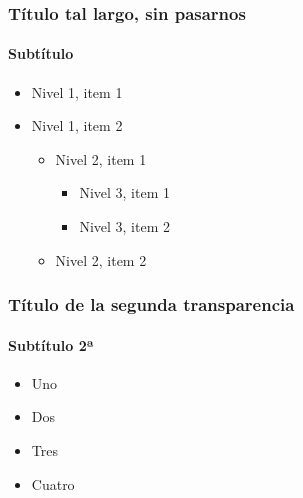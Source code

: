\documentclass[spanish,a4]{beamer}
\title[Defensa \myWorkType \textemdash \myAuthorFullName]{\myBookTitle}
\author{\myAuthorFullName}
\institute{\myResearchGroup \\ \DocumentDepartment \\ \myUniversity}
\begin{document}
\begin{frame}[plain]
  \titlepage
\end{frame}


\begin{frame}
  
  \frametitle{Título tal largo, sin pasarnos}  
  \framesubtitle{Subtítulo}  
  
  \begin{itemize}
  \item Nivel 1, item 1
  \item Nivel 1, item 2
    \begin{itemize}
    \item Nivel 2, item 1
      \begin{itemize}
      \item Nivel 3, item 1
      \item Nivel 3, item 2
      \end{itemize}
    \item Nivel 2, item 2
    \end{itemize}
    
  \end{itemize}
\end{frame}


\begin{frame}

  \frametitle{Título de la segunda transparencia}  
  \framesubtitle{Subtítulo 2ª}  

  \begin{itemize}
  \item Uno
  \item Dos
  \item Tres
  \item Cuatro
  \end{itemize}

  \label{lastPage}

\end{frame}
\end{document}
